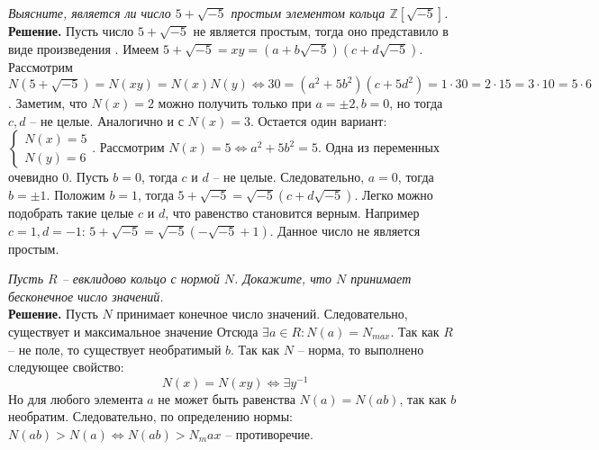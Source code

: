 \documentclass[a4paper, 12pt]{article}
\newcommand{\Z}{\mathbb{Z}}
\newcommand{\N}{\mathbb{N}}
\begin{document}
\begin{spacing}{1}
\begin{center}
\end{center}

\noindent \textit{Выясните, является ли число $5+\sqrt{-5}$ простым элементом кольца $\Z[\sqrt{-5}]$.}\\
\noindent \textbf{Решение.} Пусть число $5+\sqrt{-5}$ не является простым, тогда оно представило в виде произведения . Имеем $5+\sqrt{-5} = xy =(a + b\sqrt{-5})(c + d\sqrt{-5})$. Рассмотрим $N(5+\sqrt{-5})= N(xy) = N(x)N(y) \Leftrightarrow30 = (a^2 + 5b^2)(c + 5d^2) = 1 \cdot 30 = 2 \cdot 15 = 3 \cdot 10 = 5\cdot 6$. Заметим, что $N(x) = 2$ можно получить только при $a = \pm2, b = 0$, но тогда $c, d$ -- не целые. Аналогично и с $N(x) = 3$. Остается один вариант: $\begin{cases}
N(x) = 5\\N(y) = 6
\end{cases}$. Рассмотрим $N(x) = 5 \Leftrightarrow a^2 + 5b^2 = 5$. Одна из переменных очевидно 0. Пусть $b = 0$, тогда $c$ и $d$ -- не целые. Следовательно, $a = 0$, тогда $b = \pm 1$. Положим $b = 1$, тогда $5+\sqrt{-5} = \sqrt{-5}(c + d\sqrt{-5})$. Легко можно подобрать такие целые $c$ и $d$, что равенство становится верным. Например $c = 1, d = -1$:
$5+\sqrt{-5} = \sqrt{-5}(-\sqrt{-5} + 1)$. Данное число не является простым.
\end{spacing}



\begin{center}
\end{center}

\noindent \textit{Пусть $R$ -- евклидово кольцо с нормой $N$. Докажите, что $N$ принимает бесконечное число значений.}\\
\noindent \textbf{Решение.} Пусть $N$ принимает конечное число значений. Следовательно, существует и максимальное значение Отсюда $\exists a \in R: N(a) = N_{max}$. Так как $R$ -- не поле, то существует необратимый $b$. Так как $N$ -- норма, то выполнено следующее свойство:
$$
N(x) = N(xy) \Leftrightarrow \exists y^{-1}
$$
Но для любого элемента $a$ не может быть равенства $N(a) = N(ab)$, так как $b$ необратим. Следовательно, по определению нормы: $N(ab) > N(a) \Leftrightarrow N(ab) > N_max$ -- противоречие. 
\end{document}
